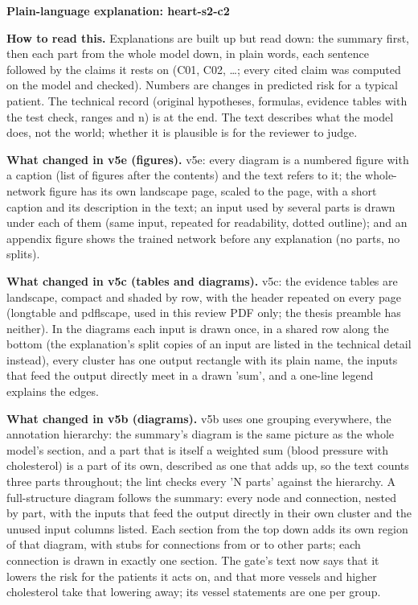 \documentclass[a4paper,10pt]{article}
\begin{document}
\begin{center}{\Large\bfseries Plain-language explanation: heart-s2-c2\par}\vspace{2mm}{\small AI-assisted drafts for review. Nothing here has been verified by a person.\par}\end{center}
\noindent\textbf{How to read this.} Explanations are built up but read down: the summary first, then each part from the whole model down, in plain words, each sentence followed by the claims it rests on (C01, C02, \ldots; every cited claim was computed on the model and checked). Numbers are changes in predicted risk for a typical patient. The technical record (original hypotheses, formulas, evidence tables with the test check, ranges and n) is at the end. The text describes what the model does, not the world; whether it is plausible is for the reviewer to judge.
\par\medskip\noindent\textbf{What changed in v5e (figures).} v5e: every diagram is a numbered figure with a caption (list of figures after the contents) and the text refers to it; the whole-network figure has its own landscape page, scaled to the page, with a short caption and its description in the text; an input used by several parts is drawn under each of them (same input, repeated for readability, dotted outline); and an appendix figure shows the trained network before any explanation (no parts, no splits).
\par\medskip\noindent\textbf{What changed in v5c (tables and diagrams).} v5c: the evidence tables are landscape, compact and shaded by row, with the header repeated on every page (longtable and pdflscape, used in this review PDF only; the thesis preamble has neither). In the diagrams each input is drawn once, in a shared row along the bottom (the explanation's split copies of an input are listed in the technical detail instead), every cluster has one output rectangle with its plain name, the inputs that feed the output directly meet in a drawn 'sum', and a one-line legend explains the edges.
\par\medskip\noindent\textbf{What changed in v5b (diagrams).} v5b uses one grouping everywhere, the annotation hierarchy: the summary's diagram is the same picture as the whole model's section, and a part that is itself a weighted sum (blood pressure with cholesterol) is a part of its own, described as one that adds up, so the text counts three parts throughout; the lint checks every 'N parts' against the hierarchy. A full-structure diagram follows the summary: every node and connection, nested by part, with the inputs that feed the output directly in their own cluster and the unused input columns listed. Each section from the top down adds its own region of that diagram, with stubs for connections from or to other parts; each connection is drawn in exactly one section. The gate's text now says that it lowers the risk for the patients it acts on, and that more vessels and higher cholesterol take that lowering away; its vessel statements are one per group.
\end{document}
